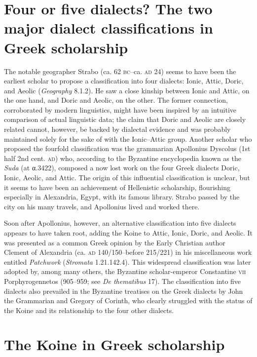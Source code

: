 \section[Four or five dialects?]{Four or five dialects? The two major dialect classifications in Greek scholarship}\label{sec:2.2}

The notable geographer Strabo (ca. 62 \textsc{bc–}ca. \textsc{ad} 24) seems to have been the earliest scholar to propose a classification into four dialects: Ionic, Attic, Doric, and Aeolic (\textit{Geography} 8.1.2). He saw a close kinship between Ionic and Attic, on the one hand, and Doric and Aeolic, on the other. The former connection, corroborated by modern linguistics, might have been inspired by an intuitive comparison of actual linguistic data; the claim that Doric and Aeolic are closely related cannot, however, be backed by dialectal evidence and was probably maintained solely for the sake of  with the Ionic–Attic group. Another scholar who proposed the fourfold classification was the grammarian Apollonius Dyscolus (1st half 2nd cent. \textsc{ad}) who, according to the Byzantine encyclopedia known as the \textit{Suda} (at α.3422), composed a now lost work on the four Greek dialects Doric, Ionic, Aeolic, and Attic. The origin of this influential classification is unclear, but it seems to have been an achievement of Hellenistic scholarship, flourishing especially in Alexandria, Egypt, with its famous library. Strabo passed by the city on his many travels, and Apollonius lived and worked there.

Soon after Apollonius, however, an alternative classification into five dialects appears to have taken root, adding the Koine to Attic, Ionic, Doric, and Aeolic. It was presented as a common Greek opinion by the Early Christian author Clement of Alexandria (ca. \textsc{ad} 140/150–before 215/221) in his miscellaneous work entitled \textit{Patchwork} (\textit{Stromata} 1.21.142.4). This widespread classification was later adopted by, among many others, the Byzantine scholar-emperor Constantine \textsc{vii} Porphyrogennetos (905–959; see \textit{De thematibus} 17). The classification into five dialects also prevailed in the Byzantine treatises on the Greek dialects by John the Grammarian and Gregory of Corinth, who clearly struggled with the status of the Koine and its relationship to the four other dialects.

\section{The Koine in Greek scholarship}\label{sec:2.3}


